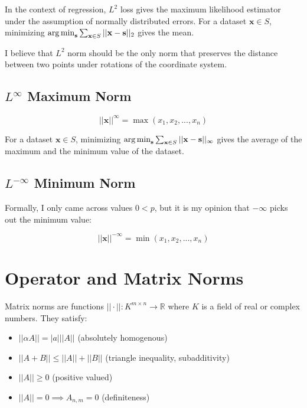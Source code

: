 In the context of regression, $L^2$ loss gives the maximum likelihood estimator under the assumption of normally distributed errors. For a dataset $\mathbf{x}\in S$, minimizing $\operatorname*{arg\,min}_{\mathbf{s}} \sum_{\mathbf{x}\in S}||\mathbf{x}-\mathbf{s}||_{2}$ gives the mean.

I believe that $L^2$ norm should be the only norm that preserves the distance between two points under rotations of the coordinate system.	

\subsection{$L^{\infty}$ Maximum Norm} 

\begin{equation}
||\mathbf{x}||^{\infty} = \max(x_1,x_2,...,x_n)
\end{equation}

For a dataset $\mathbf{x}\in S$, minimizing $\operatorname*{arg\,min}_{\mathbf{s}} \sum_{\mathbf{x}\in S}||\mathbf{x}-\mathbf{s}||_{\infty}$ gives the average of the maximum and the minimum value of the dataset.


\subsection{$L^{-\infty}$ Minimum Norm} 

Formally, I only came across values $0<p$, but it is my opinion that $-\infty$ picks out the minimum value:

\begin{equation}
||\mathbf{x}||^{-\infty} = \min(x_1,x_2,...,x_n)
\end{equation}





\section{Operator and Matrix Norms}
\label{sec:norms}

Matrix norms are functions $||\cdot||: K^{m\times n} \rightarrow \mathbb{R}$ where $K$ is a field of real or complex numbers. They satisfy:

\begin{itemize}
\item $||\alpha A|| = |a| ||A||$ (absolutely homogenous)
\item $||A+B|| \leq ||A|| + ||B||$ (triangle inequality, subadditivity)
\item $||A||\geq 0$ (positive valued)
\item $||A||=0 \implies A_{n,m}=0$ (definiteness)
\end{itemize}

